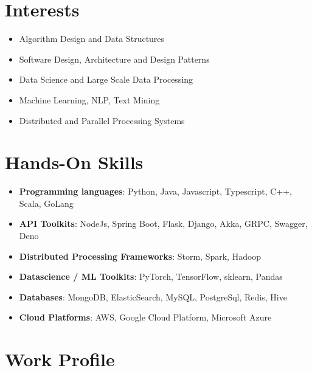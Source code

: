 \documentclass{article}
\begin{document}
\section{Interests}
\begin{itemize}[leftmargin=-0.1ex]\setlength\itemsep{0.25em}\vspace{-10pt}
  \item Algorithm Design and Data Structures
  \item Software Design, Architecture and Design Patterns
  \item Data Science and Large Scale Data Processing
  \item Machine Learning, NLP, Text Mining
  \item Distributed and Parallel Processing Systems
\end{itemize}\vspace{-3pt}

\section{Hands-On Skills }
\begin{itemize}[leftmargin=-0.1ex]\setlength\itemsep{0.25em}\vspace{-10pt}
  \item \textbf{Programming languages}: Python, Java, Javascript, Typescript, C++, Scala, GoLang
  \item \textbf{API Toolkits}: NodeJs, Spring Boot, Flask, Django, Akka, GRPC, Swagger, Deno
  \item \textbf{Distributed Processing Frameworks}: Storm, Spark, Hadoop
  \item \textbf{Datascience / ML Toolkits}: PyTorch, TensorFlow, sklearn, Pandas
  \item \textbf{Databases}: MongoDB, ElasticSearch, MySQL, PostgreSql, Redis, Hive
  \item \textbf{Cloud Platforms}: AWS, Google Cloud Platform, Microsoft Azure
\end{itemize}\vspace{-3pt}
  
\section{Work Profile}
\end{document}
